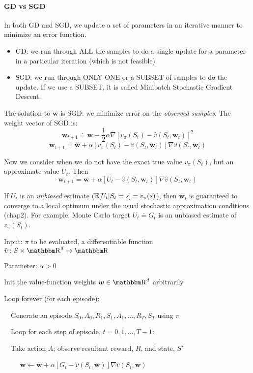 \documentclass[sutton_barto_notes.tex]{subfiles}
\begin{document}
\paragraph{GD vs SGD} In both GD and SGD, we update a set of parameters in an iterative manner to minimize an error function.
\begin{itemize}
\item GD: we run through ALL the samples to do a single update for a parameter in a particular iteration (which is not feasible)
\item SGD: we run through ONLY ONE or a SUBSET of samples to do the update. If we use a SUBSET, it is called Minibatch Stochastic Gradient Descent.
\end{itemize}

The solution to $\bm{w}$ is SGD: we minimize error on the \textit{observed samples}. The weight vector of SGD is:
$$ \bm{w}_{t+1} \doteq \bm{w} - \frac{1}{2}\alpha \nabla [v_\pi(S_t) - \hat{v}(S_t, \bm{w}_t)]^2$$
$$ \bm{w}_{t+1} = \bm{w} + \alpha[v_\pi(S_t) - \hat{v}(S_t, \bm{w}_t)]\nabla \hat{v}(S_t, \bm{w}_t) $$

Now we consider when we do not have the exact true value $v_\pi(S_t)$, but an approximate value $U_t$. Then
$$ \bm{w}_{t+1} = \bm{w} + \alpha[U_t - \hat{v}(S_t, \bm{w}_t)]\nabla \hat{v}(S_t, \bm{w}_t) $$

If $U_t$ is an \textit{unbiased} estimate ($\operatorname*{\mathbb{E}}[U_t|S_t=s]=v_\pi(s)$), then $\bm{w}_t$ is guaranteed to converge to a local optimum under the usual stochastic approximation conditions (chap2). For example, Monte Carlo target $U_t\doteq G_t$ is an unbiased estimate of $v_\pi(S_t)$.

\begin{tcolorbox}[width=1.1\textwidth,title={Gradient Monte Carlo for Estimating $\hat{v}\approx v_\pi$}]
Input: $\pi$ to be evaluated, a differentiable function $\hat{v}:S\times\R^d \rightarrow \R$

Parameter: $\alpha > 0$

Init the value-function weights $\bm{w} \in \R^d$ arbitrarily

Loop forever (for each episode):

$\quad$Generate an episode $S_0, A_0, R_1, S_1, A_1, ..., R_T, S_T$ using $\pi$

$\quad$Loop for each step of episode, $t = 0,1,...,T-1$:

$\quad$Take action $A$; observe resultant reward, $R$, and state, $S'$

$\quad\quad$ $\bm{w} \leftarrow \bm{w} + \alpha [ G_t - \hat{v}(S_t, \bm{w})]\nabla \hat{v}(S_t, \bm{w})$
\end{tcolorbox}
\end{document}
